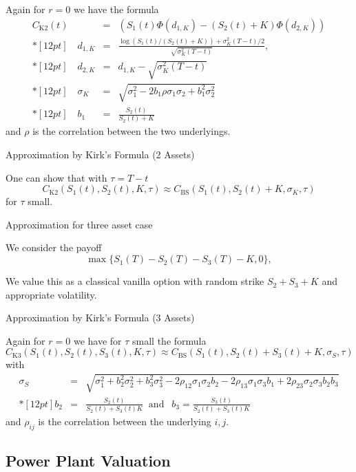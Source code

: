 Again for $r=0$ we have the formula $$\begin{array}{lll}
 C_{\mbox{K2}}(t) & = & (S_1(t)\Phi(d_{1,K})-(S_2(t)+K)\Phi(d_{2,K}))
 \\*[12pt]
 \quad d_{1,K} & = & \frac{\log(S_1(t)/(S_2(t)+K))+\sigma_K^{2}(T-t)/2}{\sqrt{\sigma_K^{2}(T-t)}},\\*[12pt]
  \quad d_{2,K} &=&d_{1,K}-\sqrt{\sigma_K^{2}(T-t)}
 \\*[12pt]
 \quad \sigma_K & = & \sqrt{\sigma_1^2-2b_1\rho\sigma_1\sigma_2+b_1^2\sigma_2^2}\\*[12pt]
 \quad b_1 &=& \frac{S_2(t)}{S_2(t)+K}
\end{array}$$
and $\rho$ is the correlation between the two underlyings.

{Approximation by Kirk's Formula (2 Assets)}

One can show that with $\tau=T-t$
$$
 C_{\mbox{K2}}(S_1(t), S_2(t), K, \tau) \approx
 C_{\mbox{BS}}(S_1(t), S_2(t)+K, \sigma_K, \tau)
 $$
  for  $\tau$ small.

{Approximation for three asset case}
\item<1-> We consider the payoff
\begin{equation}
\max\{S_1(T) - S_2(T)- S_3(T)-K, 0\},
\label{Three_asset_value}
\end{equation}
\item<2-> We value this as a classical vanilla option with random strike $S_2+S_3+K$ and appropriate volatility.

{Approximation by Kirk's Formula (3 Assets)}

Again for $r=0$ we have for  $\tau$ small the formula
{\small
\begin{equation}
 C_{\mbox{K3}}(S_1(t), S_2(t), S_3(t), K, \tau) \approx
 C_{\mbox{BS}}(S_1(t), S_2(t)+S_3(t)+K, \sigma_S, \tau)
\label{kirk3}
\end{equation}
with
 $$
 \begin{array}{lll}
 \sigma_S & = & \sqrt{\sigma_1^2+b_2^2\sigma_2^2 +b_3^2\sigma_3^2
 - 2\rho_{12}\sigma_1\sigma_2b_2 - 2\rho_{13}\sigma_1\sigma_3b_1 + 2\rho_{23}\sigma_2\sigma_3b_2b_3}\\*[12pt]
 b_2 &=& \frac{S_2(t)}{S_2(t)+S_3(t) K}
 \;\;\mbox{and}  \;\;\
  b_3 = \frac{S_3(t)}{S_2(t)+S_3(t) K}
\end{array}$$
}
and $\rho_{ij}$ is the correlation between the underlying $i,j$.

\subsection{Power Plant Valuation}
